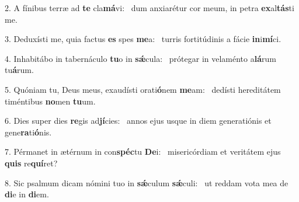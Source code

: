 2. A fínibus terræ ad \textbf{te} cla\textbf{má}vi: \ast\  dum anxiarétur cor meum, in petra \textbf{ex}al\textbf{tás}ti me.\

3. Deduxísti me, quia factus \textbf{es} spes \textbf{me}a: \ast\  turris fortitúdinis a fácie \textbf{in}i\textbf{mí}ci.\

4. Inhabitábo in tabernáculo \textbf{tu}o in \textbf{sǽ}cula: \ast\  prótegar in velaménto a\textbf{lá}rum tu\textbf{á}rum.\

5. Quóniam tu, Deus meus, exaudísti orati\textbf{ó}nem \textbf{me}am: \ast\  dedísti hereditátem timéntibus \textbf{no}men \textbf{tu}um.\

6. Dies super dies \textbf{re}gis ad\textbf{jí}cies: \ast\  annos ejus usque in diem generatiónis et gene\textbf{ra}ti\textbf{ó}nis.\

7. Pérmanet in ætérnum in con\textbf{spéc}tu \textbf{De}i: \ast\  misericórdiam et veritátem ejus \textbf{quis} re\textbf{quí}ret?\

8. Sic psalmum dicam nómini tuo in \textbf{sǽ}culum \textbf{sǽ}culi: \ast\  ut reddam vota mea de \textbf{di}e in \textbf{di}em.\

